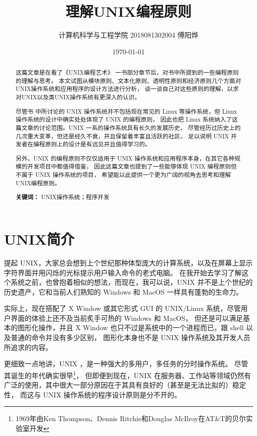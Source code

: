 \documentclass[UTF8]{ctexart}
\title{理解UNIX编程原则\\\rightline{\large——《UNIX编程艺术》读书报告}}
\author{计算机科学与工程学院 2018081302004 傅阳烨}
\date{\today}
\begin{document}
    \maketitle
    \begin{abstract}
        这篇文章是在看了《UNIX编程艺术》\cite{ArtofUNIX} 一书部分章节后，对书中所提到的一些编程原则的理解与思考。
        本文试图从模块原则、文本化原则、透明性原则和经济原则几个方面对UNIX操作系统和应用程序的设计方法进行分析，
        谈一谈自己对这些原则的理解，以求对UNIX以及类UNIX操作系统有更深入的认识。

        尽管书 \cite{ArtofUNIX} 中所讨论的 UNIX 操作系统并不包括现在常见的 Linux 等操作系统，但 Linux 操作系统的设计中确实处处体现了 UNIX 的编程原则，
        因此也把 Linux 系统纳入了这篇文章的讨论范围。UNIX 一系的操作系统具有长久的发展历史，
        尽管经历过历史上的几次重大变革，但还是经久不衰，并且保留着丰富且活跃的社区，
        足以说明 UNIX 开发者在编程原则上的设计是有远见并且值得学习的。

        另外，UNIX 的编程原则不仅仅适用于 UNIX 操作系统和应用程序本身，在其它各种规模的开发项目中都值得借鉴，
        因此这篇文章也提到了一些能够体现 UNIX 编程原则但不属于 UNIX 操作系统的项目，
        希望能以此提供一个更为广阔的视角去思考和理解UNIX编程原则。\\

        \par\textbf{关键词：} UNIX操作系统；程序开发
    \end{abstract}
    \section{UNIX简介}
        提起 UNIX，大家总会想到上个世纪那种体型庞大的计算系统，以及在屏幕上显示字符界面并用闪烁的光标提示用户输入命令的老式电脑。
        在我开始去学习了解这个系统之前，也曾抱着相似的想法，而现在，我可以说，UNIX 并不是上个世纪的历史遗产，它和当前人们熟知的 Windows 和 MacOS 一样具有蓬勃的生命力。

        实际上，现在搭配了 X Window 或其它形式 GUI 的 UNIX/Linux 系统，尽管用户界面的体验上还不及当前炙手可热的 Windows 和 MacOS，
        但还是可以满足基本的图形化操作，并且 X Window 也只不过是系统中的一个进程而已，跟 shell 以及普通的命令并没有多少区别，
        图形化本身也不是 UNIX 操作系统及其开发人员所追求的内容。

        更细致一点地讲，UNIX \cite{UNIXwiki}，是一种强大的多用户，多任务的分时操作系统。
        尽管其诞生的年代确实很早\footnote{1969年由Ken Thompson、Dennis Ritchie和Douglas McIlroy在AT\&T的贝尔实验室开发\cite{UNIXwiki}}，
        但即便到现在，UNIX 在服务器、工作站等领域仍然有广泛的使用，其中很大一部分原因在于其具有良好的（甚至是无法比拟的）稳定性，
        而这与 UNIX 操作系统的程序设计原则是分不开的。
\end{document}
